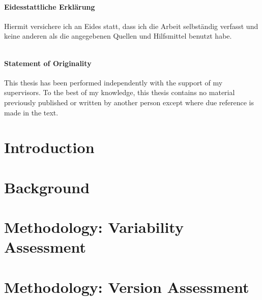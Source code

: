 \documentclass[
	12pt,
	a4paper,
	oneside,
	openright
]{scrbook}
\begin{document}

\newpage
\thispagestyle{empty}


 $$\qquad$$
 $$\qquad$$
 $$\qquad$$
  $$\qquad$$
 $$\qquad$$
 $$\qquad$$
 
\subsubsection*{Eidesstattliche Erklärung}
 Hiermit versichere ich an Eides statt, dass ich die Arbeit selbständig verfasst
 und keine anderen als die angegebenen Quellen und Hilfsmittel benutzt habe.

\vspace{1.3cm}

 $$\qquad$$
 $$\qquad$$
 $$\qquad$$
\subsubsection*{Statement of Originality}
This thesis has been performed independently with the support of my
supervisors. To the best of my knowledge, this thesis contains no material previously published or written
by another person except where due reference is made in the text.

\vspace{1.3cm}


\tableofcontents

\chapter{Introduction}\label{chapter:1}
\setcounter{page}{1}


\chapter{Background}\label{chapter:2}


\chapter{Methodology: Variability Assessment}


\chapter{Methodology: Version Assessment}

\end{document}
